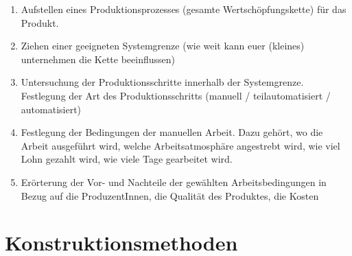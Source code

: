 \documentclass[DIV=15,headinclude=true]{scrartcl}
\begin{document}
\begin{enumerate}
	\item
	      Aufstellen eines Produktionsprozesses (gesamte Wertschöpfungskette)
	      für das Produkt.
	\item
	      Ziehen einer geeigneten Systemgrenze (wie weit kann euer (kleines)
	      unternehmen die Kette beeinflussen)
	\item
	      Untersuchung der Produktionsschritte innerhalb der Systemgrenze.
	      Festlegung der Art des Produktionsschritts (manuell /
	      teilautomatisiert / automatisiert)
	\item
	      Festlegung der Bedingungen der manuellen Arbeit. Dazu gehört, wo die
	      Arbeit ausgeführt wird, welche Arbeitsatmosphäre angestrebt wird, wie
	      viel Lohn gezahlt wird, wie viele Tage gearbeitet wird.
	\item
	      Erörterung der Vor- und Nachteile der gewählten Arbeitsbedingungen in
	      Bezug auf die ProduzentInnen, die Qualität des Produktes, die Kosten
\end{enumerate}

\section{Konstruktionsmethoden}
\end{document}
